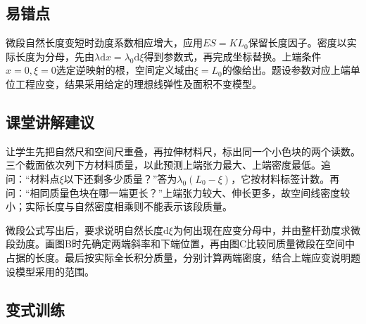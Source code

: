 \documentclass[UTF8,fontset=fandol,a4paper,11pt]{ctexart}
\begin{document}

\subsection*{易错点}

微段自然长度变短时劲度系数相应增大，应用$ES=KL_0$保留长度因子。密度以实际长度为分母，先由$\lambda\mathrm dx=\lambda_0\mathrm d\xi$得到参数式，再完成坐标替换。上端条件$x=0,\xi=0$选定逆映射的根，空间定义域由$\xi=L_0$的像给出。题设参数对应上端单位工程应变，结果采用给定的理想线弹性及面积不变模型。



\subsection*{课堂讲解建议}

让学生先把自然尺和空间尺重叠，再拉伸材料尺，标出同一个小色块的两个读数。三个截面依次列下方材料质量，以此预测上端张力最大、上端密度最低。追问：“材料点$\xi$以下还剩多少质量？”答为$\lambda_0(L_0-\xi)$，它按材料标签计数。再问：“相同质量色块在哪一端更长？”上端张力较大、伸长更多，故空间线密度较小；实际长度与自然密度相乘则不能表示该段质量。

微段公式写出后，要求说明自然长度$\mathrm d\xi$为何出现在应变分母中，并由整杆劲度求微段劲度。画图B时先确定两端斜率和下端位置，再由图C比较同质量微段在空间中占据的长度。最后按实际全长积分质量，分别计算两端密度，结合上端应变说明题设模型采用的范围。



\subsection*{变式训练}
\end{document}
